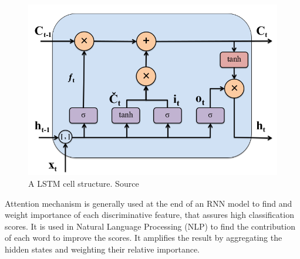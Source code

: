     \begin{figure}[h] 
        \includegraphics[height=0.6\textwidth]{images/lstm_cell.png}
        \caption{A LSTM cell structure. Source \cite{2018_DL_LSTM}}
        \label{fig:lstm_cell}
    \end{figure}
    
Attention mechanism is generally used at the end of an RNN model to find and weight importance of each discriminative feature, that assures high classification scores. It is used in Natural Language Processing (NLP) \cite{2018_DL_LSTM} to find the contribution of each word to improve the scores. It amplifies the result by aggregating the hidden states and weighting their relative importance. 

